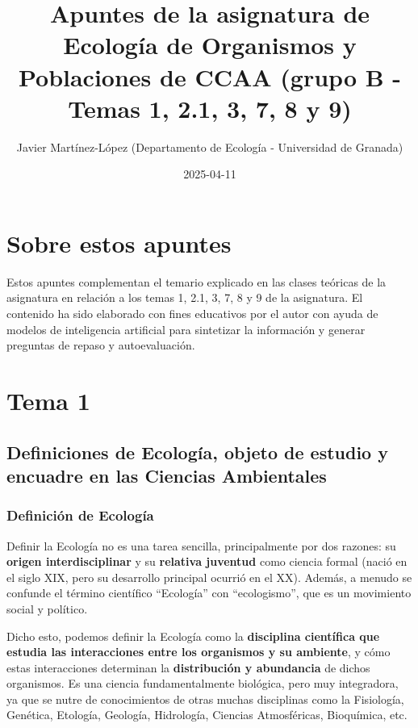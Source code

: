 \documentclass[
]{book}
\title{Apuntes de la asignatura de Ecología de Organismos y Poblaciones de CCAA (grupo B - Temas 1, 2.1, 3, 7, 8 y 9)}
\author{Javier Martínez-López (Departamento de Ecología - Universidad de Granada)}
\date{2025-04-11}
\makeatletter
\newcommand*\pandocbounded[1]{%
  \sbox\pandoc@box{#1}%
  \Gscale@div\@tempa{\textheight}{\dimexpr\ht\pandoc@box+\dp\pandoc@box\relax}%
  \Gscale@div\@tempb{\linewidth}{\wd\pandoc@box}%
  \ifdim\@tempb\p@<\@tempa\p@\let\@tempa\@tempb\fi%
  \ifdim\@tempa\p@<\p@\scalebox{\@tempa}{\usebox\pandoc@box}%
  \else\usebox{\pandoc@box}%
  \fi%
}
\makeatother
\begin{document}
\maketitle

{
\setcounter{tocdepth}{1}
\tableofcontents
}
\chapter*{Sobre estos apuntes}\label{intro}

Estos apuntes complementan el temario explicado en las clases teóricas de la asignatura en relación a los temas 1, 2.1, 3, 7, 8 y 9 de la asignatura. El contenido ha sido elaborado con fines educativos por el autor con ayuda de modelos de inteligencia artificial para sintetizar la información y generar preguntas de repaso y autoevaluación.

\href{https://doi.org/10.5281/zenodo.15198850}{\pandocbounded{}}

\chapter*{Tema 1}\label{tema1}

\section*{Definiciones de Ecología, objeto de estudio y encuadre en las Ciencias Ambientales}\label{ecointro}

\subsection*{Definición de Ecología}\label{ecologia}

Definir la Ecología no es una tarea sencilla, principalmente por dos razones: su \textbf{origen interdisciplinar} y su \textbf{relativa juventud} como ciencia formal (nació en el siglo XIX, pero su desarrollo principal ocurrió en el XX). Además, a menudo se confunde el término científico ``Ecología'' con ``ecologismo'', que es un movimiento social y político.

Dicho esto, podemos definir la Ecología como la \textbf{disciplina científica que estudia las interacciones entre los organismos y su ambiente}, y cómo estas interacciones determinan la \textbf{distribución y abundancia} de dichos organismos. Es una ciencia fundamentalmente biológica, pero muy integradora, ya que se nutre de conocimientos de otras muchas disciplinas como la Fisiología, Genética, Etología, Geología, Hidrología, Ciencias Atmosféricas, Bioquímica, etc.
\end{document}
